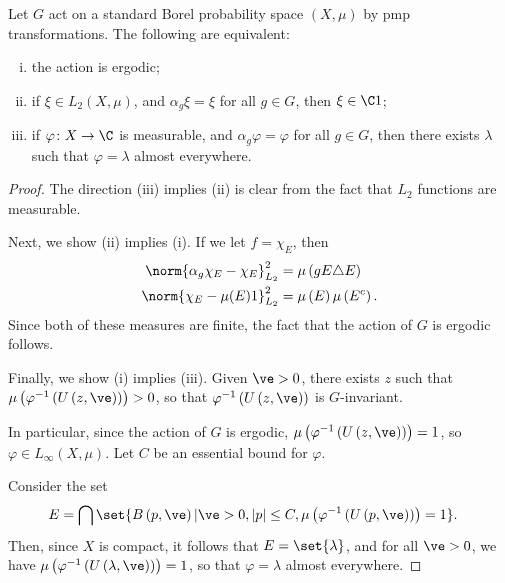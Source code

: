 \documentclass[10pt]{mypackage}
\begin{document}
\begin{proposition}
  Let $G$ act on a standard Borel probability space $\left( X,\mu \right)$ by pmp transformations. The following are equivalent:
  \begin{enumerate}[(i)]
    \item the action is ergodic;
    \item if $\xi\in L_2\left( X,\mu \right)$, and $\alpha_{g}\xi = \xi$ for all $g\in G$, then $\xi\in \C 1$;
    \item if $\varphi\colon X\rightarrow \C$ is measurable, and $\alpha_g\varphi = \varphi$ for all $g\in G$, then there exists $\lambda$ such that $\varphi = \lambda$ almost everywhere.
  \end{enumerate}
\end{proposition}
\begin{proof}
  The direction (iii) implies (ii) is clear from the fact that $L_2$ functions are measurable.

  Next, we show (ii) implies (i). If we let $f = \chi_E$, then
  \begin{align*}
    \norm{\alpha_g\chi_E - \chi_E}_{L_2}^2 &= \mu\left( gE \triangle E \right)\\
    \norm{\chi_E - \mu(E)1}_{L_2}^2 &= \mu\left( E \right)\mu\left( E^{c} \right).
  \end{align*}
  Since both of these measures are finite, the fact that the action of $G$ is ergodic follows.

  Finally, we show (i) implies (iii). Given $\ve > 0$, there exists $z$ such that $\mu\left( \varphi^{-1}\left( U\left( z,\ve \right) \right) \right) > 0$, so that $\varphi^{-1}\left( U\left( z,\ve \right) \right)$ is $G$-invariant.

  In particular, since the action of $G$ is ergodic, $\mu\left( \varphi^{-1}\left( U\left( z,\ve \right) \right) \right) = 1$, so $\varphi\in L_{\infty}\left( X,\mu \right)$. Let $C$ be an essential bound for $\varphi$.

  Consider the set
  \begin{align*}
    E &= \bigcap \set{ B\left( p,\ve \right) | \ve > 0,\left\vert p \right\vert\leq C,\mu\left( \varphi^{-1}\left( U\left( p,\ve \right) \right) \right) = 1}.
  \end{align*}
  Then, since $X$ is compact, it follows that $E = \set{\lambda}$, and for all $\ve > 0$, we have $\mu\left( \varphi^{-1}\left( U\left( \lambda,\ve \right) \right) \right) = 1$, so that $\varphi = \lambda$ almost everywhere.
\end{proof}
\end{document}
